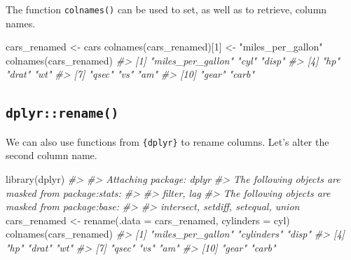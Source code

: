 \documentclass[
  12pt,
]{book}
\newenvironment{Shaded}{\begin{snugshade}}{\end{snugshade}}
\newcommand{\AttributeTok}[1]{\textcolor[rgb]{0.77,0.63,0.00}{#1}}
\newcommand{\CommentTok}[1]{\textcolor[rgb]{0.56,0.35,0.01}{\textit{#1}}}
\newcommand{\DecValTok}[1]{\textcolor[rgb]{0.00,0.00,0.81}{#1}}
\newcommand{\FunctionTok}[1]{\textcolor[rgb]{0.00,0.00,0.00}{#1}}
\newcommand{\NormalTok}[1]{#1}
\newcommand{\OtherTok}[1]{\textcolor[rgb]{0.56,0.35,0.01}{#1}}
\newcommand{\StringTok}[1]{\textcolor[rgb]{0.31,0.60,0.02}{#1}}
\begin{document}
The function \texttt{colnames()} can be used to set, as well as to retrieve, column names.

\begin{Shaded}
\begin{Highlighting}[]
\NormalTok{cars\_renamed }\OtherTok{\textless{}{-}}\NormalTok{ cars }
\FunctionTok{colnames}\NormalTok{(cars\_renamed)[}\DecValTok{1}\NormalTok{] }\OtherTok{\textless{}{-}} \StringTok{"miles\_per\_gallon"}
\FunctionTok{colnames}\NormalTok{(cars\_renamed)}
\CommentTok{\#\textgreater{}  [1] "miles\_per\_gallon" "cyl"              "disp"            }
\CommentTok{\#\textgreater{}  [4] "hp"               "drat"             "wt"              }
\CommentTok{\#\textgreater{}  [7] "qsec"             "vs"               "am"              }
\CommentTok{\#\textgreater{} [10] "gear"             "carb"}
\end{Highlighting}
\end{Shaded}

\hypertarget{dplyrrename}{%
\subsection{\texorpdfstring{\texttt{dplyr::rename()}}{dplyr::rename()}}\label{dplyrrename}}

We can also use functions from \texttt{\{dplyr\}} to rename columns. Let's alter the second column name.

\begin{Shaded}
\begin{Highlighting}[]
\FunctionTok{library}\NormalTok{(dplyr)}
\CommentTok{\#\textgreater{} }
\CommentTok{\#\textgreater{} Attaching package: \textquotesingle{}dplyr\textquotesingle{}}
\CommentTok{\#\textgreater{} The following objects are masked from \textquotesingle{}package:stats\textquotesingle{}:}
\CommentTok{\#\textgreater{} }
\CommentTok{\#\textgreater{}     filter, lag}
\CommentTok{\#\textgreater{} The following objects are masked from \textquotesingle{}package:base\textquotesingle{}:}
\CommentTok{\#\textgreater{} }
\CommentTok{\#\textgreater{}     intersect, setdiff, setequal, union}
\NormalTok{cars\_renamed }\OtherTok{\textless{}{-}} \FunctionTok{rename}\NormalTok{(}\AttributeTok{.data =}\NormalTok{ cars\_renamed, }\AttributeTok{cylinders =}\NormalTok{ cyl)}
\FunctionTok{colnames}\NormalTok{(cars\_renamed)}
\CommentTok{\#\textgreater{}  [1] "miles\_per\_gallon" "cylinders"        "disp"            }
\CommentTok{\#\textgreater{}  [4] "hp"               "drat"             "wt"              }
\CommentTok{\#\textgreater{}  [7] "qsec"             "vs"               "am"              }
\CommentTok{\#\textgreater{} [10] "gear"             "carb"}
\end{Highlighting}
\end{Shaded}
\end{document}

